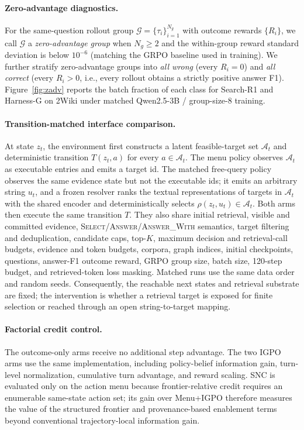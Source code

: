 \documentclass[letterpaper]{article} %
\begin{document}
\paragraph{Zero-advantage diagnostics.}
For the same-question rollout group $\mathcal{G}=\{\tau_i\}_{i=1}^{N_g}$ with outcome rewards $\{R_i\}$, we call $\mathcal{G}$ a \emph{zero-advantage group} when $N_g\geq2$ and the within-group reward standard deviation is below $10^{-6}$ (matching the GRPO baseline used in training).
We further stratify zero-advantage groups into \emph{all wrong} (every $R_i=0$) and \emph{all correct} (every $R_i>0$, i.e., every rollout obtains a strictly positive answer F1).
Figure~\ref{fig:zadv} reports the batch fraction of each class for Search-R1 and Harness-G on 2Wiki under matched Qwen2.5-3B / group-size-$8$ training.

\paragraph{Transition-matched interface comparison.}
At state $z_t$, the environment first constructs a latent feasible-target set $\mathcal{A}_t$ and deterministic transition $T(z_t,a)$ for every $a\in\mathcal{A}_t$.
The menu policy observes $\mathcal{A}_t$ as executable entries and emits a target id.
The matched free-query policy observes the same evidence state but not the executable ids; it emits an arbitrary string $u_t$, and a frozen resolver ranks the textual representations of targets in $\mathcal{A}_t$ with the shared encoder and deterministically selects $\rho(z_t,u_t)\in\mathcal{A}_t$.
Both arms then execute the same transition $T$.
They also share initial retrieval, visible and committed evidence, \textsc{Select}/\textsc{Answer}/\textsc{Answer\_With} semantics, target filtering and deduplication, candidate caps, top-$K$, maximum decision and retrieval-call budgets, evidence and token budgets, corpora, graph indices, initial checkpoints, questions, answer-F1 outcome reward, GRPO group size, batch size, 120-step budget, and retrieved-token loss masking.
Matched runs use the same data order and random seeds.
Consequently, the reachable next states and retrieval substrate are fixed; the intervention is whether a retrieval target is exposed for finite selection or reached through an open string-to-target mapping.

\paragraph{Factorial credit control.}
The outcome-only arms receive no additional step advantage.
The two IGPO arms \citep{igpo2025} use the same implementation, including policy-belief information gain, turn-level normalization, cumulative turn advantage, and reward scaling.
SNC is evaluated only on the action menu because frontier-relative credit requires an enumerable same-state action set; its gain over Menu+IGPO therefore measures the value of the structured frontier and provenance-based enablement terms beyond conventional trajectory-local information gain.
\end{document}
